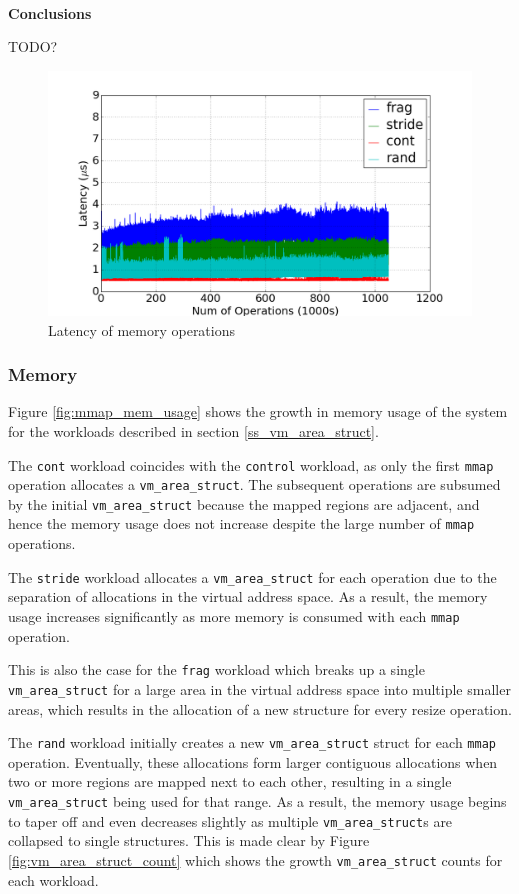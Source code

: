 \documentclass[twocolumn,11pt]{article}
\begin{document}
~\\ \textbf{Conclusions}

TODO?

\begin{figure}
    \includegraphics[width=\columnwidth]{figures/mmap_latency}
    \caption{Latency of memory operations}
    \label{fig:mmap_latency}
\end{figure}

\subsubsection{Memory}
Figure \ref{fig:mmap_mem_usage} shows the growth in memory usage of the system
for the workloads described in section \ref{ss_vm_area_struct}. 

The
\texttt{cont} workload coincides with the \texttt{control} workload, as only the
first \texttt{mmap} operation allocates a \texttt{vm\_area\_struct}. The subsequent
operations are subsumed by the initial \texttt{vm\_area\_struct} because the mapped
regions are adjacent, and hence the memory usage does not increase despite the
large number of \texttt{mmap} operations.  

The \texttt{stride} workload allocates a
\texttt{vm\_area\_struct} for each operation due to the separation of
allocations in the virtual address space. As a result, the memory usage
increases significantly as more memory is consumed with each \texttt{mmap} operation.

This is also the case for the \texttt{frag} workload which breaks up a single
\texttt{vm\_area\_struct} for a large area in the virtual address space into
multiple smaller areas, which results in the allocation of a new structure for
every resize operation. 

The \texttt{rand} workload initially creates a new
\texttt{vm\_area\_struct} struct for each \texttt{mmap} operation. Eventually, these
allocations form larger contiguous allocations when two or more regions are
mapped next to each other, resulting in a single \texttt{vm\_area\_struct} being
used for that range. As a result, the memory usage begins to taper off and
even decreases slightly as multiple \texttt{vm\_area\_struct}s are collapsed to
single structures. This is made clear by Figure \ref{fig:vm_area_struct_count}
which shows the growth \texttt{vm\_area\_struct} counts for each workload.
\end{document}
